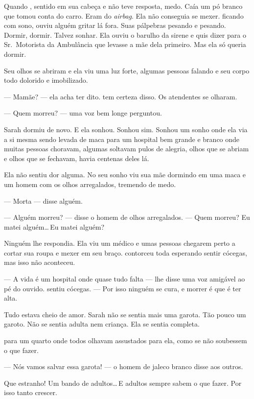 Quando , sentido  em sua cabeça e não teve resposta,  medo. Caía um pó branco que tomou conta do carro. Eram do \emph{airbag}. Ela não conseguia se mexer.  ficando com sono, ouviu alguém gritar lá fora. Suas pálpebras pesando e pesando. Dormir, dormir. Talvez sonhar. Ela ouviu o barulho da sirene e quis dizer para o Sr.~Motorista da Ambulância que levasse a mãe dela primeiro. Mas ela só queria dormir.

Seu olhos se abriram e ela viu uma luz forte, algumas pessoas falando e seu corpo todo dolorido e imobilizado.

--- Mamãe? --- ela acha ter dito.  tem certeza disso. Os atendentes se olharam.

--- Quem morreu? --- uma voz bem longe perguntou.

Sarah dormiu de novo. E ela sonhou. Sonhou\mudanca{,} sim. Sonhou um sonho onde ela via a si mesma sendo levada de maca para um hospital bem grande e branco onde muitas pessoas choravam, algumas soltavam pulos de alegria,  olhos que se abriam e olhos que se fechavam, havia centenas deles lá.

Ela não sentiu dor alguma. No seu sonho\mudanca{,} viu sua mãe dormindo em uma maca e um homem com os olhos arregalados, tremendo de medo.

--- Morta --- disse alguém.

--- Alguém morreu? --- disse o homem de olhos arregalados. --- Quem morreu? Eu matei alguém\ldots\,Eu matei alguém?

Ninguém lhe respondia. Ela viu um médico e umas pessoas chegarem perto  a cortar sua roupa e mexer em seu braço.  contorceu toda esperando sentir cócegas, mas isso não aconteceu.

--- A vida é um hospital onde quase tudo falta --- lhe disse uma voz amigável ao pé do ouvido.  sentiu cócegas. --- Por isso ninguém se cura, e morrer é que é ter alta.

Tudo estava cheio de amor. Sarah não se sentia mais uma garota. Tão pouco um garoto.  Não se sentia adulta nem criança. Ela se sentia completa.

 para um quarto onde todos olhavam assustados para ela, como se não soubessem o que fazer.

--- Nós vamos salvar essa garota! --- o homem de jaleco branco disse aos outros.

Que estranho! Um bando de adultos\ldots\,E adultos sempre sabem o que fazer. Por isso  tanto crescer.

